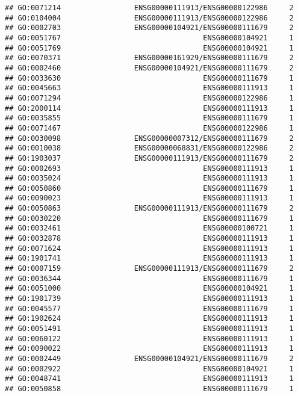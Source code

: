 \documentclass[
]{article}
\begin{document}
\begin{verbatim}
## GO:0071214                 ENSG00000111913/ENSG00000122986     2
## GO:0104004                 ENSG00000111913/ENSG00000122986     2
## GO:0002703                 ENSG00000104921/ENSG00000111679     2
## GO:0051767                                 ENSG00000104921     1
## GO:0051769                                 ENSG00000104921     1
## GO:0070371                 ENSG00000161929/ENSG00000111679     2
## GO:0002460                 ENSG00000104921/ENSG00000111679     2
## GO:0033630                                 ENSG00000111679     1
## GO:0045663                                 ENSG00000111913     1
## GO:0071294                                 ENSG00000122986     1
## GO:2000114                                 ENSG00000111913     1
## GO:0035855                                 ENSG00000111679     1
## GO:0071467                                 ENSG00000122986     1
## GO:0030098                 ENSG00000007312/ENSG00000111679     2
## GO:0010038                 ENSG00000068831/ENSG00000122986     2
## GO:1903037                 ENSG00000111913/ENSG00000111679     2
## GO:0002693                                 ENSG00000111913     1
## GO:0035024                                 ENSG00000111913     1
## GO:0050860                                 ENSG00000111679     1
## GO:0090023                                 ENSG00000111913     1
## GO:0050863                 ENSG00000111913/ENSG00000111679     2
## GO:0030220                                 ENSG00000111679     1
## GO:0032461                                 ENSG00000100721     1
## GO:0032878                                 ENSG00000111913     1
## GO:0071624                                 ENSG00000111913     1
## GO:1901741                                 ENSG00000111913     1
## GO:0007159                 ENSG00000111913/ENSG00000111679     2
## GO:0036344                                 ENSG00000111679     1
## GO:0051000                                 ENSG00000104921     1
## GO:1901739                                 ENSG00000111913     1
## GO:0045577                                 ENSG00000111679     1
## GO:1902624                                 ENSG00000111913     1
## GO:0051491                                 ENSG00000111913     1
## GO:0060122                                 ENSG00000111913     1
## GO:0090022                                 ENSG00000111913     1
## GO:0002449                 ENSG00000104921/ENSG00000111679     2
## GO:0002922                                 ENSG00000104921     1
## GO:0048741                                 ENSG00000111913     1
## GO:0050858                                 ENSG00000111679     1

\end{verbatim}
\end{document}
